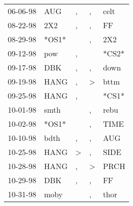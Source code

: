 \begin{supertabular}{p{0.07\textwidth}p{0.06\textwidth}p{0.02\textwidth}p{0.02\textwidth}p{0.06\textwidth}}
          06-06-98\textsuperscript{} &            AUG\textsuperscript{} &                , &                , &           celt\textsuperscript{} \\
          08-22-98\textsuperscript{} &            2X2\textsuperscript{} &                , &                , &             FF\textsuperscript{} \\
          08-29-98\textsuperscript{} &                            *OS1* &                  &                , &            2X2\textsuperscript{} \\
          09-12-98\textsuperscript{} &            pow\textsuperscript{} &                , &                  &                            *CS2* \\
          09-17-98\textsuperscript{} &            DBK\textsuperscript{} &                , &                , &           down\textsuperscript{} \\
          09-19-98\textsuperscript{} &           HANG\textsuperscript{} &                , &     \textgreater &           bttm\textsuperscript{} \\
          09-25-98\textsuperscript{} &           HANG\textsuperscript{} &                , &                  &                            *CS1* \\
          10-01-98\textsuperscript{} &           smth\textsuperscript{} &                  &                , &           rebu\textsuperscript{} \\
          10-02-98\textsuperscript{} &                            *OS1* &                  &                , &           TIME\textsuperscript{} \\
          10-10-98\textsuperscript{} &           bdth\textsuperscript{} &                , &                , &            AUG\textsuperscript{} \\
          10-25-98\textsuperscript{} &           HANG\textsuperscript{} &     \textgreater &                , &           SIDE\textsuperscript{} \\
          10-28-98\textsuperscript{} &           HANG\textsuperscript{} &                , &     \textgreater &           PRCH\textsuperscript{} \\
          10-29-98\textsuperscript{} &            DBK\textsuperscript{} &                , &                , &             FF\textsuperscript{} \\
          10-31-98\textsuperscript{} &           moby\textsuperscript{} &                  &                , &           thor\textsuperscript{} \\

\end{supertabular}
